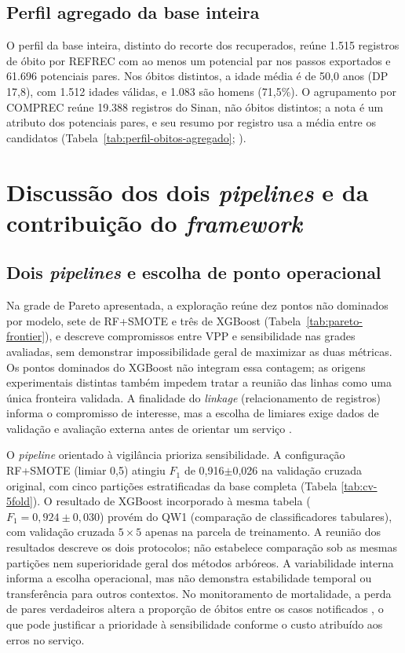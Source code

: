 \subsection{Perfil agregado da base inteira}\label{sec:e3-perfil-obitos}

O perfil da base inteira, distinto do recorte dos recuperados, reúne 1.515 registros de óbito por REFREC com ao menos um potencial par nos passos exportados e 61.696 potenciais pares. Nos óbitos distintos, a idade média é de 50,0 anos (DP 17,8), com 1.512 idades válidas, e 1.083 são homens (71,5\%). O agrupamento por COMPREC reúne 19.388 registros do Sinan, não óbitos distintos; a nota é um atributo dos potenciais pares, e seu resumo por registro usa a média entre os candidatos (Tabela~\ref{tab:perfil-obitos-agregado}; ).



\section{Discussão dos dois \textit{pipelines} e da contribuição do \textit{framework}}\label{sec:e3-ap-discussao}

\subsection{Dois \textit{pipelines} e escolha de ponto operacional}\label{sec:e3-dois-pipelines}

Na grade de Pareto apresentada, a exploração reúne dez pontos não dominados por modelo, sete de RF+SMOTE e três de XGBoost (Tabela~\ref{tab:pareto-frontier}), e descreve compromissos entre VPP e sensibilidade nas grades avaliadas, sem demonstrar impossibilidade geral de maximizar as duas métricas. Os pontos dominados do XGBoost não integram essa contagem; as origens experimentais distintas também impedem tratar a reunião das linhas como uma única fronteira validada. A finalidade do \textit{linkage} (relacionamento de registros) informa o compromisso de interesse, mas a escolha de limiares exige dados de validação e avaliação externa antes de orientar um serviço \cite{Harron2017linkagequality}.

O \textit{pipeline} orientado à vigilância prioriza sensibilidade. A configuração RF+SMOTE (limiar 0,5) atingiu $F_1$ de 0,916$\pm$0,026 na validação cruzada original, com cinco partições estratificadas da base completa (Tabela \ref{tab:cv-5fold}). O resultado de XGBoost incorporado à mesma tabela ($F_1 = 0{,}924 \pm 0{,}030$) provém do QW1 (comparação de classificadores tabulares), com validação cruzada $5 \times 5$ apenas na parcela de treinamento. A reunião dos resultados descreve os dois protocolos; não estabelece comparação sob as mesmas partições nem superioridade geral dos métodos arbóreos. A variabilidade interna informa a escolha operacional, mas não demonstra estabilidade temporal ou transferência para outros contextos. No monitoramento de mortalidade, a perda de pares verdadeiros altera a proporção de óbitos entre os casos notificados \cite{Bartholomay2014improved}, o que pode justificar a prioridade à sensibilidade conforme o custo atribuído aos erros no serviço.


